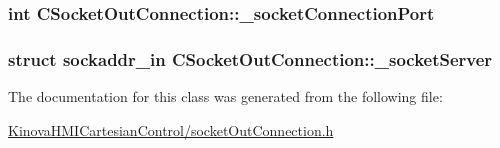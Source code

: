 \subsubsection[{\texorpdfstring{\+\_\+socket\+Connection\+Port}{_socketConnectionPort}}]{\setlength{\rightskip}{0pt plus 5cm}int C\+Socket\+Out\+Connection\+::\+\_\+socket\+Connection\+Port\hspace{0.3cm}{\ttfamily [protected]}}\hypertarget{classCSocketOutConnection_a760902b8101aca205a3556020bc7bc50}{}\label{classCSocketOutConnection_a760902b8101aca205a3556020bc7bc50}
\subsubsection[{\texorpdfstring{\+\_\+socket\+Server}{_socketServer}}]{\setlength{\rightskip}{0pt plus 5cm}struct sockaddr\+\_\+in C\+Socket\+Out\+Connection\+::\+\_\+socket\+Server\hspace{0.3cm}{\ttfamily [protected]}}\hypertarget{classCSocketOutConnection_a7a4a2efbc8fced507bd76b88c2725af3}{}\label{classCSocketOutConnection_a7a4a2efbc8fced507bd76b88c2725af3}


The documentation for this class was generated from the following file\+:\begin{DoxyCompactItemize}
\item 
\hyperlink{KinovaHMICartesianControl_2socketOutConnection_8h}{Kinova\+H\+M\+I\+Cartesian\+Control/socket\+Out\+Connection.\+h}\end{DoxyCompactItemize}
